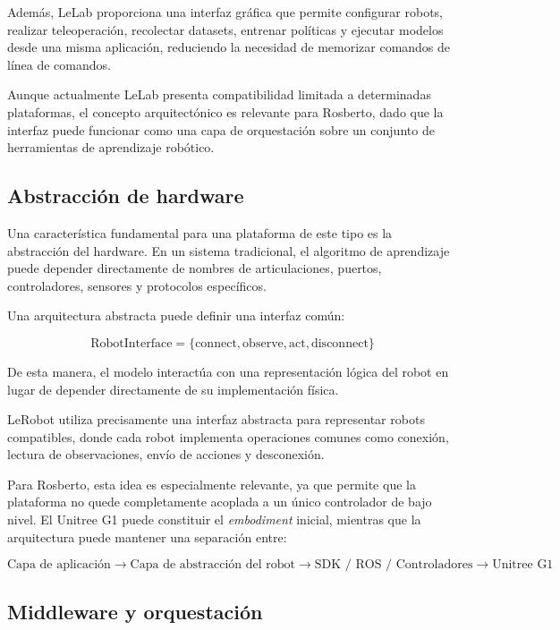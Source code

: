 \documentclass[stu,12pt,floatsintext]{apa7}
\begin{document}
Además, LeLab proporciona una interfaz gráfica que permite configurar robots, realizar teleoperación, recolectar datasets, entrenar políticas y ejecutar modelos desde una misma aplicación, reduciendo la necesidad de memorizar comandos de línea de comandos.

Aunque actualmente LeLab presenta compatibilidad limitada a determinadas plataformas, el concepto arquitectónico es relevante para Rosberto, dado que la interfaz puede funcionar como una capa de orquestación sobre un conjunto de herramientas de aprendizaje robótico.

\subsection{Abstracción de hardware}

Una característica fundamental para una plataforma de este tipo es la abstracción del hardware. En un sistema tradicional, el algoritmo de aprendizaje puede depender directamente de nombres de articulaciones, puertos, controladores, sensores y protocolos específicos.

Una arquitectura abstracta puede definir una interfaz común:

\begin{equation}
\mathrm{RobotInterface}
=
\{
\mathrm{connect},
\mathrm{observe},
\mathrm{act},
\mathrm{disconnect}
\}
\end{equation}

De esta manera, el modelo interactúa con una representación lógica del robot en lugar de depender directamente de su implementación física.

LeRobot utiliza precisamente una interfaz abstracta para representar robots compatibles, donde cada robot implementa operaciones comunes como conexión, lectura de observaciones, envío de acciones y desconexión.

Para Rosberto, esta idea es especialmente relevante, ya que permite que la plataforma no quede completamente acoplada a un único controlador de bajo nivel. El Unitree G1 puede constituir el \textit{embodiment} inicial, mientras que la arquitectura puede mantener una separación entre:

\begin{equation}
\text{Capa de aplicación}
\rightarrow
\text{Capa de abstracción del robot}
\rightarrow
\text{SDK / ROS / Controladores}
\rightarrow
\text{Unitree G1}
\end{equation}

\subsection{Middleware y orquestación}
\end{document}
